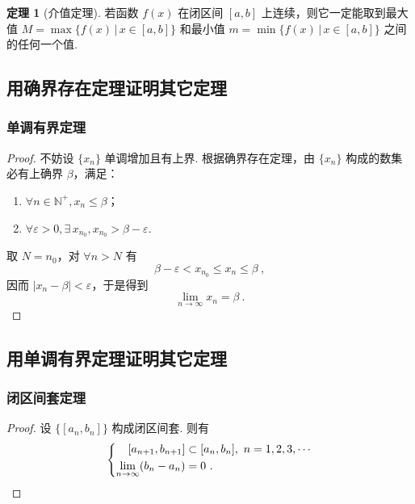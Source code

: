 \documentclass[zihao=-4,linespread=1.8,UTF8,nothm]{aytony_base}
\theoremstyle{definition}
\newtheorem{theoremsec}{\indent\heiti\textbf{定理}}[section]
\begin{document}
\begin{appendices}
    \begin{theoremsec}[介值定理]
        若函数 $f(x)$ 在闭区间 $[a, b]$ 上连续，则它一定能取到最大值 $M = \max\{f(x)\,|\,x \in [a, b]\}$ 和最小值 $m = \min \{f(x)\,|\,x \in [a, b]\}$ 之间的任何一个值.
    \end{theoremsec}

    \subsection{用确界存在定理证明其它定理}

    \subsubsection{单调有界定理}

    \begin{proof}
        不妨设 $\{x_n\}$ 单调增加且有上界. 根据确界存在定理，由 $\{x_n\}$ 构成的数集必有上确界 $\beta$，满足：
        \begin{enumerate}
            \item $\forall n \in \mathbb{N}^+, x_n \leqslant \beta$；
            \item $\forall \varepsilon > 0, \exists\, x_{n_0}, x_{n_0} > \beta - \varepsilon$.
        \end{enumerate}

        取 $N = n_0$，对 $\forall n > N$ 有 $$
            \beta - \varepsilon < x_{n_0} \leqslant x_n \leqslant \beta\ ,
        $$ 因而 $|x_n - \beta| < \varepsilon$，于是得到 $$
            \lim\limits_{n \to \infty} x_n = \beta\ .
        $$
    \end{proof}

    \subsection{用单调有界定理证明其它定理}

    \subsubsection{闭区间套定理}

    \begin{proof}
        设 $\{[a_n, b_n]\}$ 构成闭区间套. 则有 $$
            \left\{
            \begin{aligned}\relax
                [a_{n+1}, b_{n+1}]                     & \subset [a_n, b_n],\ n = 1, 2, 3, \cdots \\
                \lim\limits_{n \to \infty} (b_n - a_n) & = 0\ .
            \end{aligned}
            \right.
        $$


\end{proof}
\end{appendices}
\end{document}
